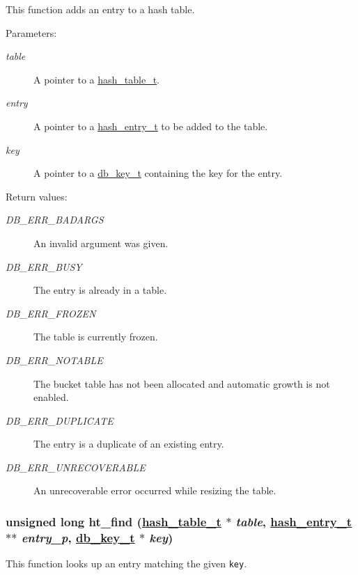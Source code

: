 This function adds an entry to a hash table.

\begin{Desc}
\item[Parameters:]
\begin{description}
\item[{\em table}]A pointer to a \hyperlink{group__dbprim__hash_a0}{hash\_\-table\_\-t}. \item[{\em entry}]A pointer to a \hyperlink{group__dbprim__hash_a1}{hash\_\-entry\_\-t} to be added to the table. \item[{\em key}]A pointer to a \hyperlink{group__dbprim_a0}{db\_\-key\_\-t} containing the key for the entry.\end{description}
\end{Desc}
\begin{Desc}
\item[Return values:]
\begin{description}
\item[{\em DB\_\-ERR\_\-BADARGS}]An invalid argument was given. \item[{\em DB\_\-ERR\_\-BUSY}]The entry is already in a table. \item[{\em DB\_\-ERR\_\-FROZEN}]The table is currently frozen. \item[{\em DB\_\-ERR\_\-NOTABLE}]The bucket table has not been allocated and automatic growth is not enabled. \item[{\em DB\_\-ERR\_\-DUPLICATE}]The entry is a duplicate of an existing entry. \item[{\em DB\_\-ERR\_\-UNRECOVERABLE}]An unrecoverable error occurred while resizing the table. \end{description}
\end{Desc}
\hypertarget{group__dbprim__hash_a10}{
\subsubsection[ht\_\-find]{\setlength{\rightskip}{0pt plus 5cm}unsigned long ht\_\-find (\hyperlink{dbprim_8h_a0}{hash\_\-table\_\-t} $\ast$ {\em table}, \hyperlink{dbprim_8h_a1}{hash\_\-entry\_\-t} $\ast$$\ast$ {\em entry\_\-p}, \hyperlink{dbprim_8h_a0}{db\_\-key\_\-t} $\ast$ {\em key})}}
\label{group__dbprim__hash_a10}


This function looks up an entry matching the given {\tt key}.

